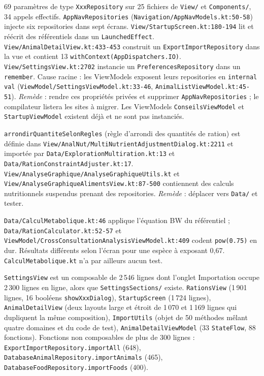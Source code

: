 \documentclass[11pt,a4paper]{article}
\newcommand{\fichier}[1]{\texttt{\small #1}}
\newcommand{\code}[1]{\texttt{#1}}
\newcommand{\sev}[1]{\textbf{#1}}
\begin{document}
\begin{description}[style=nextline]
\item[\sev{Critique} --- Les vues accèdent directement aux repositories.]
  69 paramètres de type \code{XxxRepository} sur 25 fichiers de \fichier{View/} et
  \fichier{Components/}, 34 appels effectifs. \code{AppNavRepositories}
  (\fichier{Navigation/AppNavModels.kt:50-58}) injecte six repositories dans sept écrans.
  \fichier{View/StartupScreen.kt:180-194} lit et réécrit des référentiels dans un
  \code{LaunchedEffect}. \fichier{View/AnimalDetailView.kt:433-453} construit un
  \code{ExportImportRepository} dans la vue et contient 13 \code{withContext(AppDispatchers.IO)}.
  \fichier{View/SettingsView.kt:2702} instancie un \code{PreferencesRepository} dans un
  \code{remember}. Cause racine : les ViewModels exposent leurs repositories en \code{internal val}
  (\fichier{ViewModel/SettingsViewModel.kt:33-46}, \fichier{AnimalListViewModel.kt:45-51}).
  \emph{Remède} : rendre ces propriétés privées et supprimer \code{AppNavRepositories} ; le
  compilateur listera les sites à migrer. Les ViewModels \code{ConseilsViewModel} et
  \code{StartupViewModel} existent déjà et ne sont pas instanciés.

\item[\sev{Majeur} --- Logique métier dans les vues, dépendance inversée Data $\rightarrow$ View.]
  \code{arrondirQuantiteSelonRegles} (règle d'arrondi des quantités de ration) est définie dans
  \fichier{View/AnalNut/MultiNutrientAdjustmentDialog.kt:2211} et importée par
  \fichier{Data/ExplorationMultiration.kt:13} et \fichier{Data/RationConstraintAdjuster.kt:17}.
  \fichier{View/AnalyseGraphique/AnalyseGraphiqueUtils.kt} et
  \fichier{View/AnalyseGraphiqueAlimentsView.kt:87-500} contiennent des calculs nutritionnels
  suspendus prenant des repositories. \emph{Remède} : déplacer vers \fichier{Data/} et tester.

\item[\sev{Majeur} --- Trois implémentations du poids métabolique.]
  \fichier{Data/CalculMetabolique.kt:46} applique l'équation BW du référentiel ;
  \fichier{Data/RationCalculator.kt:52-57} et
  \fichier{ViewModel/CrossConsultationAnalysisViewModel.kt:409} codent \code{pow(0.75)} en dur.
  Résultats différents selon l'écran pour une espèce à exposant 0,67.
  \code{CalculMetabolique.kt} n'a par ailleurs aucun test.

\item[\sev{Majeur} --- Fichiers monolithiques.]
  \code{SettingsView} est un composable de 2\,546 lignes dont l'onglet Importation occupe
  2\,300 lignes en ligne, alors que \fichier{SettingsSections/} existe. \code{RationsView}
  (1\,901 lignes, 16 booléens \code{showXxxDialog}), \code{StartupScreen} (1\,724 lignes),
  \code{AnimalDetailView} (deux layouts large et étroit de 1\,070 et 1\,169 lignes qui dupliquent
  la même composition), \code{ImportUtils} (objet de 50 méthodes mêlant quatre domaines et du code
  de test), \code{AnimalDetailViewModel} (33 \code{StateFlow}, 88 fonctions). Fonctions non
  composables de plus de 300 lignes : \code{ExportImportRepository.importAll} (648),
  \code{DatabaseAnimalRepository.importAnimals} (465), \code{DatabaseFoodRepository.importFoods} (400).


\end{description}
\end{document}
